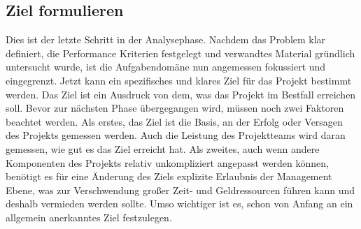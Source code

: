     \subsection{Ziel formulieren}

    Dies ist der letzte Schritt in der Analysephase. Nachdem das Problem klar definiert, die 
    Performance Kriterien festgelegt und verwandtes Material gründlich untersucht wurde, ist die 
    Aufgabendomäne nun angemessen fokussiert und eingegrenzt. Jetzt kann ein spezifisches und 
    klares Ziel für das Projekt bestimmt werden. Das Ziel ist ein Ausdruck von dem, was das Projekt 
    im Bestfall erreichen soll. Bevor zur nächsten Phase übergegangen wird, müssen noch zwei 
    Faktoren beachtet werden. 
    Als erstes, das Ziel ist die Basis, an der Erfolg oder Versagen des Projekts gemessen 
    werden. Auch die Leistung des Projektteams wird daran gemessen, wie gut es das Ziel erreicht hat. 
    Als zweites, auch wenn andere Komponenten des Projekts relativ unkompliziert angepasst 
    werden können, benötigt es für eine Änderung des Ziels explizite Erlaubnis der Management 
    Ebene, was zur Verschwendung großer Zeit- und Geldressourcen führen kann und deshalb vermieden 
    werden sollte. Umso wichtiger ist es, schon von Anfang an ein allgemein anerkanntes Ziel festzulegen.

    
    

